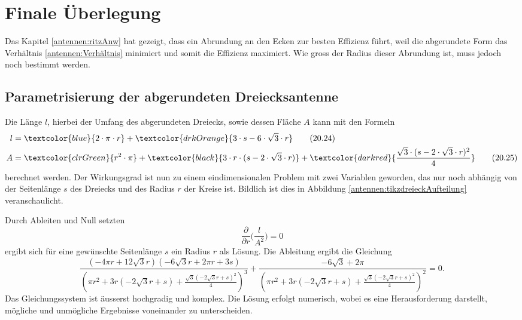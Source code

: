 %
%
% 
%
%
\section{Finale Überlegung\label{antennen:resultat}}

Das Kapitel \ref{antennen:ritzAnw} hat gezeigt, dass ein Abrundung an den Ecken
zur besten Effizienz führt, weil die abgerundete Form das Verhältnis \eqref{antennen:Verhältnis}
minimiert und somit die Effizienz maximiert. Wie gross der Radius dieser Abrundung
ist, muss jedoch noch bestimmt werden.


\subsection{Parametrisierung der abgerundeten Dreiecksantenne\label{antennen:param3eck}}
Die Länge $l$, hierbei der Umfang 
des abgerundeten Dreiecks, sowie dessen Fläche $A$ kann mit den Formeln
\begin{align}
	l &= \textcolor{blue}{2 \cdot \pi \cdot r} + \textcolor{drkOrange}{3 \cdot s - 6 \cdot \sqrt{3} \cdot r} \tag{20.24} \label{antennen:Länge} \\
	A &= \textcolor{clrGreen}{r^2 \cdot \pi} + \textcolor{black}{3 \cdot r \cdot (s - 2 \cdot \sqrt{3} \cdot r)} + \textcolor{darkred}{\frac{\sqrt{3} \cdot (s - 2 \cdot \sqrt{3} \cdot r)^2}{4}} \tag{20.25} \label{antennen:Fläche}
\end{align}\setcounter{equation}{25}%
berechnet werden.
Der Wirkungsgrad ist nun zu einem eindimensionalen Problem mit zwei Variablen geworden, das nur noch abhängig von 
der Seitenlänge $s$ des Dreiecks und des Radius $r$ der Kreise ist. Bildlich ist dies 
in Abbildung \ref{antennen:tikzdreieckAufteilung} veranschaulicht.


Durch Ableiten und Null setzten
\begin{equation}
	\frac{\partial}{\partial{r}} \bigg(\frac{l}{A^2}\bigg)=0
	\label{antennen:Ableitung}
\end{equation}
ergibt sich für eine gewünschte Seitenlänge $s$ ein Radius $r$ als Lösung. 
Die Ableitung ergibt die Gleichung 
\begin{equation}
	\frac{(- 4 \pi r + 12 \sqrt{3} r) (- 6 \sqrt{3} r + 2 \pi r + 3 s)}{\left(\pi r^{2} + 3 r (- 2 \sqrt{3} r + s) + \frac{\sqrt{3} \left(- 2 \sqrt{3} r + s\right)^{2}}{4}\right)^{3}} + \frac{- 6 \sqrt{3} + 2 \pi}{\left(\pi r^{2} + 3 r (- 2 \sqrt{3} r + s) + \frac{\sqrt{3} \left(- 2 \sqrt{3} r + s\right)^{2}}{4}\right)^{2}}=0.
	\label{antennen:Ableitunggelöst}
\end{equation}
Das Gleichungssystem ist äusserst hochgradig und komplex. Die Lösung erfolgt numerisch, 
wobei es eine Herausforderung darstellt, mögliche und unmögliche Ergebnisse voneinander zu unterscheiden.

